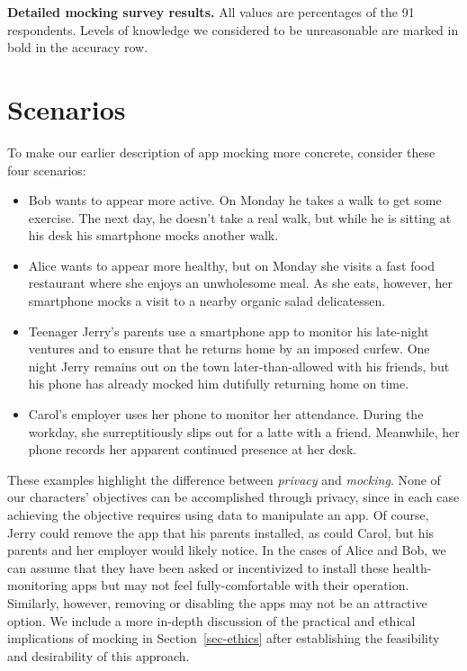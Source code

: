 
\begin{table*}[t]



\caption{\textbf{Detailed mocking survey results.} All values are percentages
of the 91 respondents. Levels of knowledge we considered to be unreasonable
are marked in bold in the accuracy row.}

\label{table-surveyresults}

\end{table*}

\section{Scenarios}
\label{sec-scenarios}

To make our earlier description of app mocking more concrete, consider these
four scenarios:

\begin{itemize}

\item Bob wants to appear more active. On Monday he takes a walk to get some
exercise. The next day, he doesn't take a real walk, but while he is sitting
at his desk his smartphone mocks another walk.

\item Alice wants to appear more healthy, but on Monday she visits a fast
food restaurant where she enjoys an unwholesome meal. As she eats, however, her
smartphone mocks a visit to a nearby organic salad delicatessen.

\item Teenager Jerry's parents use a smartphone app to monitor his late-night
  ventures and to ensure that he returns home by an imposed curfew. One
  night Jerry remains out on the town later-than-allowed with his friends,
  but his phone has already mocked him dutifully returning home on time.

\item Carol's employer uses her phone to monitor her attendance. During the
workday, she surreptitiously slips out for a latte with a friend.  Meanwhile,
her phone records her apparent continued presence at her desk.

\end{itemize}

These examples highlight the difference between \textit{privacy} and
\textit{mocking}. None of our characters' objectives can be accomplished
through privacy, since in each case achieving the objective requires using
data to manipulate an app. Of course, Jerry could remove the app that his
parents installed, as could Carol, but his parents and her employer would
likely notice. In the cases of Alice and Bob, we can assume that they have
been asked or incentivized to install these health-monitoring apps but may
not feel fully-comfortable with their operation. Similarly, however, removing
or disabling the apps may not be an attractive option. We include a more
in-depth discussion of the practical and ethical implications of mocking in
Section~\ref{sec-ethics} after establishing the feasibility and desirability
of this approach.
